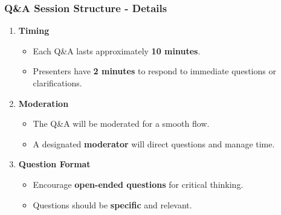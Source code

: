 \documentclass[aspectratio=169]{beamer}
\begin{document}
\begin{frame}[fragile]
    \frametitle{Q\&A Session Structure - Details}
    \begin{enumerate}
        \item \textbf{Timing}
            \begin{itemize}
                \item Each Q\&A lasts approximately \textbf{10 minutes}.
                \item Presenters have \textbf{2 minutes} to respond to immediate questions or clarifications.
            \end{itemize}
        
        \item \textbf{Moderation}
            \begin{itemize}
                \item The Q\&A will be moderated for a smooth flow.
                \item A designated \textbf{moderator} will direct questions and manage time.
            \end{itemize}
        
        \item \textbf{Question Format}
            \begin{itemize}
                \item Encourage \textbf{open-ended questions} for critical thinking.
                \item Questions should be \textbf{specific} and relevant.
            \end{itemize}
    \end{enumerate}
\end{frame}
\end{document}
